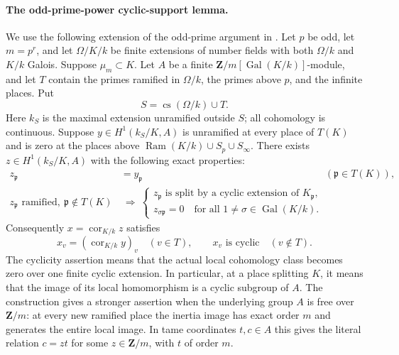 \paragraph{The odd-prime-power cyclic-support lemma.}
We use the following extension of the odd-prime argument in
\cite[Theorem~13 and its proof, pp.~14--19]{RootSchmidtWingberg1998}.
Let \(p\) be odd, let \(m=p^r\), and let
\(\Omega/K/k\) be finite extensions of number fields with both
\(\Omega/k\) and \(K/k\) Galois.  Suppose \(\mu_m\subset K\).
Let \(A\) be a finite \(\mathbf Z/m[\operatorname{Gal}(K/k)]\)-module,
and let \(T\) contain the primes ramified in \(\Omega/k\),
the primes above \(p\), and the infinite places.  Put
\[
 S=\operatorname{cs}(\Omega/k)\cup T.
 \tag{A.130.S1}
\]
Here \(k_S\) is the maximal extension unramified outside \(S\);
all cohomology is continuous.  Suppose
\(y\in H^1(k_S/K,A)\) is unramified at every place of \(T(K)\)
and is zero at the places above
\(\operatorname{Ram}(K/k)\cup S_p\cup S_\infty\).
There exists \(z\in H^1(k_S/K,A)\) with the following exact
properties:
\[
\begin{aligned}
 z_{\mathfrak p}&=y_{\mathfrak p}
                         &&(\mathfrak p\in T(K)),\\
 z_{\mathfrak p}\text{ ramified},\ \mathfrak p\notin T(K)
 &\ \Longrightarrow\
 \begin{cases}
 z_{\mathfrak p}\text{ is split by a cyclic extension of }K_{\mathfrak p},\\
 z_{\sigma\mathfrak p}=0
       \quad\text{for all }1\ne\sigma\in\operatorname{Gal}(K/k).
 \end{cases}
\end{aligned}
 \tag{A.130.S2}
\]
Consequently \(x=\operatorname{cor}_{K/k}z\) satisfies
\[
 x_v=(\operatorname{cor}_{K/k}y)_v\quad(v\in T),
 \qquad x_v\text{ is cyclic}\quad(v\notin T).
 \tag{A.130.S3}
\]
The cyclicity assertion means that the actual local cohomology
class becomes zero over one finite cyclic extension.
In particular, at a place splitting \(K\), it means that the
image of its local homomorphism is a cyclic subgroup of \(A\).
The construction gives a stronger assertion when the underlying
group \(A\) is free over \(\mathbf Z/m\): at every new ramified
place the inertia image has exact order \(m\) and generates
the entire local image.  In tame coordinates \(t,c\in A\)
this gives the literal relation \(c=zt\) for some
\(z\in\mathbf Z/m\), with \(t\) of order \(m\).

